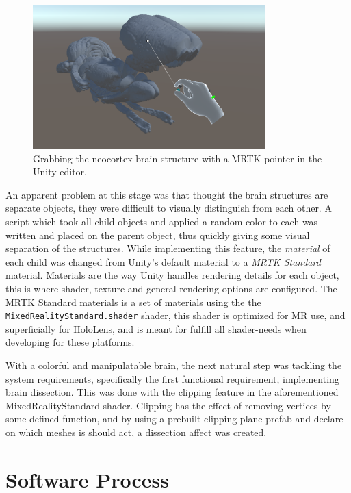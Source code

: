 \begin{figure}[ht]
    \centering
    \includegraphics[width=0.8\textwidth]{fig/grabbrainsection.png}
    \caption{Grabbing the neocortex brain structure with a MRTK pointer in the Unity editor.}
    \label{fig:grabbrain}
\end{figure}

An apparent problem at this stage was that thought the brain structures are separate objects, they were difficult to visually distinguish from each other. A script which took all child objects and applied a random color to each was written and placed on the parent object, thus quickly giving some visual separation of the structures. While implementing this feature, the \textit{material} of each child was changed from Unity's default material to a \textit{MRTK Standard} material. Materials are the way Unity handles rendering details for each object, this is where shader, texture and general rendering options are configured. The MRTK Standard materials is a set of materials using the the \texttt{MixedRealityStandard.shader} shader, this shader is optimized for MR use, and superficially for HoloLens, and is meant for fulfill all shader-needs when developing for these platforms. 

With a colorful and manipulatable brain, the next natural step was tackling the system requirements, specifically the first functional requirement, implementing brain dissection. This was done with the clipping feature in the aforementioned MixedRealityStandard shader. Clipping has the effect of removing vertices by some defined function, and by using a prebuilt clipping plane prefab and declare on which meshes is should act, a dissection affect was created. 


\section{Software Process}

